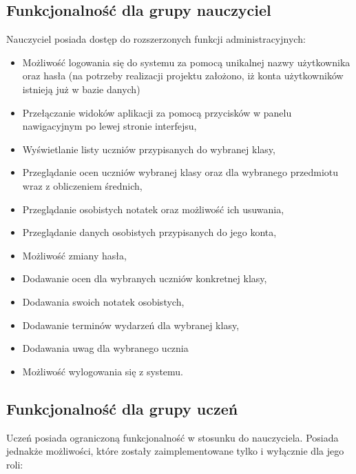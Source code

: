 \subsection{Funkcjonalność dla grupy nauczyciel}
\label{nauczyciel}
Nauczyciel posiada dostęp do rozszerzonych funkcji administracyjnych: 

\begin{itemize}
      \item Możliwość logowania się do systemu za pomocą unikalnej nazwy użytkownika oraz hasła (na potrzeby realizacji projektu założono, iż konta użytkowników istnieją już w bazie danych)
      \item Przełączanie widoków aplikacji za pomocą przycisków w panelu nawigacyjnym po lewej stronie interfejsu,
      \item Wyświetlanie listy uczniów przypisanych do wybranej klasy,
      \item Przeglądanie ocen uczniów wybranej klasy oraz dla wybranego przedmiotu wraz z obliczeniem średnich,
      \item Przeglądanie osobistych notatek oraz możliwość ich usuwania,
      \item Przeglądanie danych osobistych przypisanych do jego konta,
      \item Możliwość zmiany hasła,
      \item Dodawanie ocen dla wybranych uczniów konkretnej klasy,
      \item Dodawania swoich notatek osobistych,
      \item Dodawanie terminów wydarzeń dla wybranej klasy,
      \item Dodawania uwag dla wybranego ucznia
      \item Możliwość wylogowania się z systemu.
\end{itemize}

\subsection{Funkcjonalność dla grupy uczeń}
\label{uczeń}
Uczeń posiada ograniczoną funkcjonalność w stosunku do nauczyciela. Posiada jednakże możliwości, które zostały zaimplementowane tylko i wyłącznie dla jego roli:

